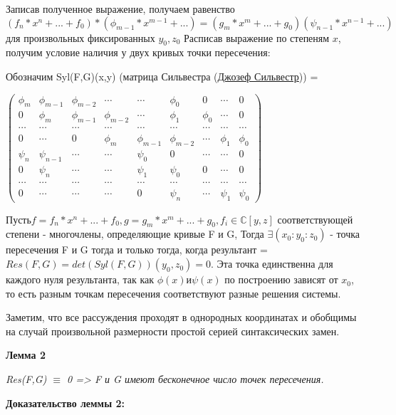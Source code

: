 \documentclass[a4paper, 12pt]{article}
\begin{document}
Записав полученное выражение, получаем равенство $(f_n*x^n + ... + f_0)*(\phi_{m-1}*x^{m-1} + ...) = (g_m*x^m + ... + g_0)(\psi_{n-1}*x^{n-1} + ...)$ для произвольных фиксированных $y_0, z_0$
Расписав выражение по степеням $x$, получим условие наличия у двух кривых точки пересечения:

Обозначим Syl(F,G)(x,y) (матрица Сильвестра (\href{https://ru.wikipedia.org/wiki/%D0%A1%D0%B8%D0%BB%D1%8C%D0%B2%D0%B5%D1%81%D1%82%D1%80,_%D0%94%D0%B6%D0%B5%D0%B9%D0%BC%D1%81_%D0%94%D0%B6%D0%BE%D0%B7%D0%B5%D1%84}{Джозеф Сильвестр})) =

$\begin{pmatrix}
\phi_m & \phi_{m-1} & \phi_{m-2} & \cdots & \cdots & \phi_0 & 0 & \cdots & 0 \\
0 & \phi_m & \phi_{m-1} & \phi_{m-2} & \cdots & \phi_1 & \phi_0 & \cdots & 0 \\
\cdots & \cdots & \cdots & \cdots & \cdots & \cdots & \cdots & \cdots & \cdots \\
0 & \cdots & 0 & \phi_m & \phi_{m-1} & \phi_{m-2} & \cdots & \phi_1 & \phi_0 \\
\psi_n & \psi_{n-1} & \cdots & \cdots & \psi_0 & 0 & \cdots & \cdots & 0 \\
0 & \psi_n & \cdots & \cdots & \psi_1 & \psi_0 & 0 & \cdots & 0 \\
\cdots & \cdots & \cdots & \cdots & \cdots & \cdots & \cdots & \cdots & \cdots \\
0 & \cdots & \cdots & \cdots & 0 & \psi_n & \cdots & \psi_1 & \psi_0
\end{pmatrix}$

$Пусть f=f_n*x^n + ... + f_0, g=g_m*x^m + ... + g_0, f_i \in \mathbb{C}[y,z]$ соответствующей степени - многочлены, определяющие кривые F и G,
Тогда $\exists (x_0:y_0:z_0)$ - точка пересечения F и G тогда и только тогда, когда результант = $Res(F,G) = det(Syl(F,G))(y_0,z_0) = 0$. Эта точка единственна для каждого нуля результанта, так как $\phi(x) и \psi(x)$ по построению зависят от $x_0$, то есть разным точкам пересечения соответствуют разные решения системы.

Заметим, что все рассуждения проходят в однородных координатах и обобщимы на случай произвольной размерности простой серией синтаксических замен.

\textbf{Лемма 2}

\textit{Res(F,G) $\equiv$ 0 => F и G имеют бесконечное число точек пересечения.}

\textbf{Доказательство леммы 2:}
\end{document}
